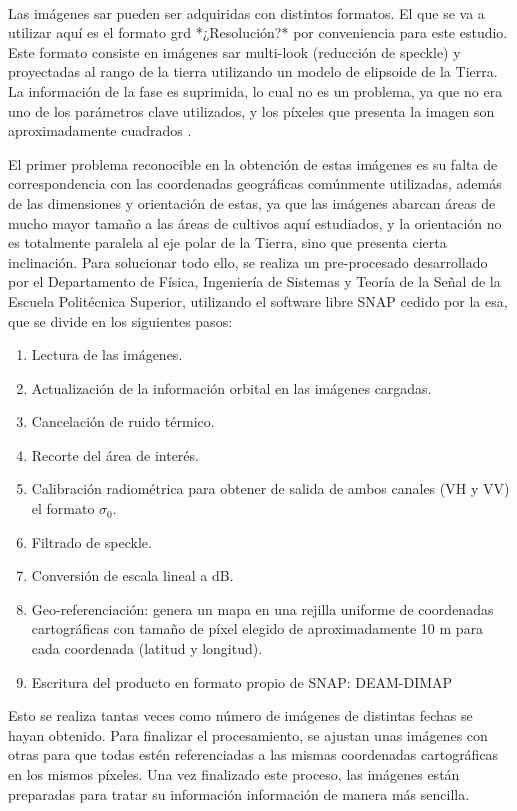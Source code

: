 \\
\par Las imágenes \gls{sar} pueden ser adquiridas con distintos formatos. El que se va a utilizar aquí es el formato \gls{grd} *¿Resolución?* por conveniencia para este estudio. Este formato consiste en imágenes \gls{sar} multi-look (reducción de speckle) y proyectadas al rango de la tierra utilizando un modelo de elipsoide de la Tierra. La información de la fase es suprimida, lo cual no es un problema, ya que no era uno de los parámetros clave utilizados, y los píxeles que presenta la imagen son aproximadamente cuadrados \cite{copData}. 
\\
\par El primer problema reconocible en la obtención de estas imágenes es su falta de correspondencia con las coordenadas geográficas comúnmente utilizadas, además de las dimensiones y orientación de estas, ya que las imágenes abarcan áreas de mucho mayor tamaño a las áreas de cultivos aquí estudiados, y la orientación no es totalmente paralela al eje polar de la Tierra, sino que presenta cierta inclinación. Para solucionar todo ello, se realiza un pre-procesado desarrollado por el Departamento de Física, Ingeniería de Sistemas y Teoría de la Señal de la Escuela Politécnica Superior, utilizando el software libre SNAP cedido por la \gls{esa}, que se divide en los siguientes pasos:
\begin{enumerate}
	\item Lectura de las imágenes.
	\item Actualización de la información orbital en las imágenes cargadas.
	\item Cancelación de ruido térmico.
	\item Recorte del área de interés.
	\item Calibración radiométrica para obtener de salida de ambos canales (VH y VV) el formato $\sigma_{0}$.
	\item Filtrado de speckle.
	\item Conversión de escala lineal a dB.
	\item Geo-referenciación: genera un mapa en una rejilla uniforme de
coordenadas cartográficas con tamaño de píxel elegido de aproximadamente 10 m para cada coordenada (latitud y longitud).
	\item Escritura del producto en formato propio de SNAP: DEAM-DIMAP 
\end{enumerate}
\par Esto se realiza tantas veces como número de imágenes de distintas fechas se hayan obtenido. Para finalizar el procesamiento, se ajustan unas imágenes con otras para que todas estén referenciadas a las mismas coordenadas cartográficas en los mismos píxeles. Una vez finalizado este proceso, las imágenes están preparadas para tratar su información información de manera más sencilla.  


